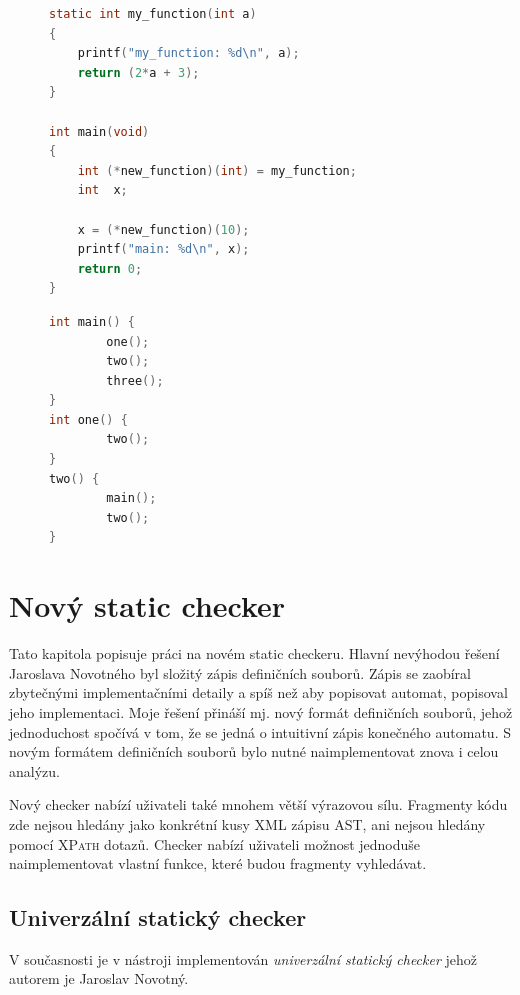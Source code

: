 \documentclass[11pt,final,oneside]{fithesis}
\begin{document}
\begin{figure}[ht]
\begin{lstlisting}[language=C,caption=Funkce volaná ukazatelem,label=pointer-c]
static int my_function(int a)
{
    printf("my_function: %d\n", a);
    return (2*a + 3);
}

int main(void)
{
    int (*new_function)(int) = my_function;
    int  x;

    x = (*new_function)(10);
    printf("main: %d\n", x);
    return 0;
}
\end{lstlisting}
\end{figure}


\begin{figure}[ht]
\begin{lstlisting}[language=C,caption=Zdrojový kód použitý v ukázkách grafu volání,label=normal-c]
int main() {
        one();
        two();
        three();
}
int one() {
        two();
}
two() {
        main();
        two();
}
\end{lstlisting}
\end{figure}



\chapter{Nový static checker}\label{automaton-checker}

Tato kapitola popisuje práci na novém static checkeru. Hlavní nevýhodou řešení Jaroslava Novotného byl složitý zápis definičních souborů. Zápis se zaobíral zbytečnými implementačními detaily a spíš než aby popisovat automat, popisoval jeho implementaci. Moje řešení přináší mj. nový formát definičních souborů, jehož jednoduchost spočívá v tom, že se jedná o intuitivní zápis konečného automatu. S novým formátem definičních souborů bylo nutné naimplementovat znova i celou analýzu.

Nový checker nabízí uživateli také mnohem větší výrazovou sílu. Fragmenty kódu zde nejsou hledány jako konkrétní kusy XML zápisu AST, ani nejsou hledány pomocí \textsc{XPath} dotazů. Checker nabízí uživateli možnost jednoduše naimplementovat vlastní funkce, které budou fragmenty vyhledávat.

\section{Univerzální statický checker}
V současnosti je v nástroji implementován \textit{univerzální statický checker} jehož autorem je Jaroslav Novotný\cite{jarek}.
\end{document}
